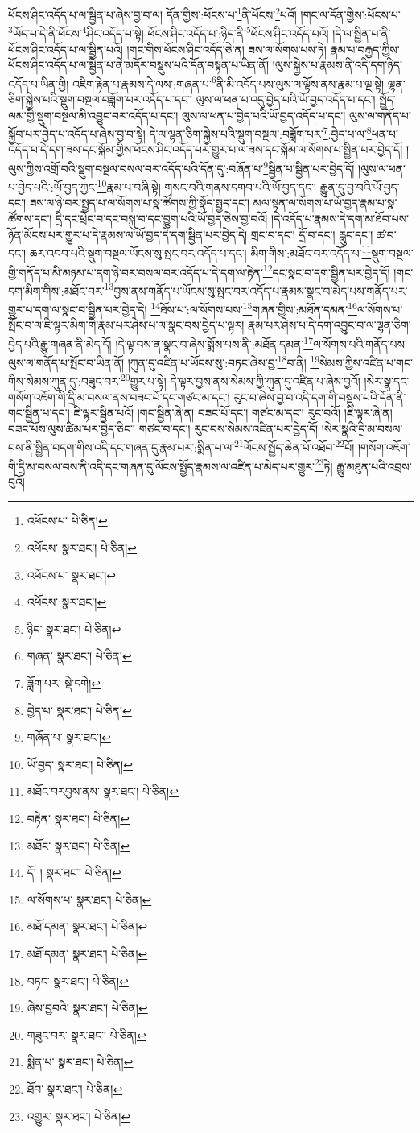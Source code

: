 ཕོངས་ཤིང་འདོད་པ་ལ་སྦྱིན་པ་ཞེས་བྱ་བ་ལ། དོན་གྱིས་:ཕོངས་པ་\footnote{འཕོངས་པ་  པེ་ཅིན། }ནི་ཕོངས་\footnote{འཕོངས་  སྣར་ཐང་།  པེ་ཅིན། }པའོ། །གང་ལ་དོན་གྱིས་:ཕོངས་པ་\footnote{འཕོངས་པ་  སྣར་ཐང་། }ཡོད་པ་དེ་ནི་ཕོངས་\footnote{འཕོངས་  སྣར་ཐང་། }ཤིང་འདོད་པ་སྟེ། ཕོངས་ཤིང་འདོད་པ་:ཉིད་ནི་\footnote{ཉིད་  སྣར་ཐང་།  པེ་ཅིན། }ཕོངས་ཤིང་འདོད་པའོ། །དེ་ལ་སྦྱིན་པ་ནི་ཕོངས་ཤིང་འདོད་པ་ལ་སྦྱིན་པའོ། །གང་གིས་ཕོངས་ཤིང་འདོད་ཅེ་ན། ཟས་ལ་སོགས་པས་ཏེ། རྣམ་པ་བརྒྱད་ཀྱིས་ཕོངས་ཤིང་འདོད་པ་ལ་སྦྱིན་པ་ནི་མདོར་བསྡུས་པའི་དོན་བསྟན་པ་ཡིན་ནོ། །ལུས་སྐྱེས་པ་རྣམས་ནི་འདི་དག་ཉིད་འདོད་པ་ཡིན་གྱི། འཇིག་རྟེན་པ་རྣམས་དེ་ལས་:གཞན་པ་\footnote{གཞན་  སྣར་ཐང་།  པེ་ཅིན། }ནི་མི་འདོད་པས་ལུས་ལ་ལྟོས་ནས་རྣམ་པ་ལྔ་སྟེ། ལྷན་ཅིག་སྐྱེས་པའི་སྡུག་བསྔལ་བཟློག་པར་འདོད་པ་དང་། ལུས་ལ་ཕན་པ་འདུ་བྱེད་པའི་ཡོ་བྱད་འདོད་པ་དང་། སྤྱོད་ལམ་གྱི་སྡུག་བསྔལ་མི་འབྱུང་བར་འདོད་པ་དང་། ལུས་ལ་ཕན་པ་བྱེད་པའི་ཡོ་བྱད་འདོད་པ་དང་། ལུས་ལ་གནོད་པ་སྐྱོབ་པར་བྱེད་པ་འདོད་པ་ཞེས་བྱ་བ་སྟེ། དེ་ལ་ལྷན་ཅིག་སྐྱེས་པའི་སྡུག་བསྔལ་:བཟློག་པར་\footnote{ཟློག་པར་  སྡེ་དགེ། }:བྱེད་པ་ལ་\footnote{བྱེད་པ་  སྣར་ཐང་།  པེ་ཅིན། }ཕན་པ་འདོད་པ་དེ་དག་ཟས་དང་སྐོམ་གྱིས་ཕོངས་ཤིང་འདོད་པར་གྱུར་པ་ལ་ཟས་དང་སྐོམ་ལ་སོགས་པ་སྦྱིན་པར་བྱེད་དོ། །ལུས་ཀྱིས་འགྲོ་བའི་སྡུག་བསྔལ་བསལ་བར་འདོད་པའི་དོན་དུ་:བཞོན་པ་\footnote{གཞོན་པ་  སྣར་ཐང་། }སྦྱིན་པ་སྦྱིན་པར་བྱེད་དོ། །ལུས་ལ་ཕན་པ་བྱེད་པའི་:ཡོ་བྱད་ཀྱང་\footnote{ཡོ་བྱད་  སྣར་ཐང་།  པེ་ཅིན། }རྣམ་པ་བཞི་སྟེ། གསང་བའི་གནས་དགབ་པའི་ཡོ་བྱད་དང་། རྒྱུན་དུ་བྱ་བའི་ཡོ་བྱད་དང་། ཟས་ལ་ཉེ་བར་སྤྱད་པ་ལ་སོགས་པ་སྣ་ཚོགས་ཀྱི་སྣོད་སྤྱད་དང་། མལ་སྟན་ལ་སོགས་པ་ཡོ་བྱད་རྣམ་པ་སྣ་ཚོགས་དང་། དྲི་དང་ཕྲེང་བ་དང་བསྐུ་བ་དང་བྱུག་པའི་ཡོ་བྱད་ཅེས་བྱ་བའོ། །དེ་འདོད་པ་རྣམས་དེ་དག་མ་ཐོབ་པས་ཉོན་མོངས་པར་གྱུར་པ་དེ་རྣམས་ལ་ཡོ་བྱད་དེ་དག་སྦྱིན་པར་བྱེད་དེ། གྲང་བ་དང་། དྲོ་བ་དང་། རླུང་དང་། ཚ་བ་དང་། ཆར་འབབ་པའི་སྡུག་བསྔལ་ཡོངས་སུ་སྤང་བར་འདོད་པ་དང་། མིག་གིས་:མཐོང་བར་འདོད་པ་\footnote{མཐོང་བརབྱས་ནས་  སྣར་ཐང་།  པེ་ཅིན། }སྡུག་བསྔལ་གྱི་གནོད་པ་མི་མཉམ་པ་དག་ཉེ་བར་བསལ་བར་འདོད་པ་དེ་དག་ལ་རྟེན་\footnote{བརྟེན་  སྣར་ཐང་།  པེ་ཅིན། }དང་སྣང་བ་དག་སྦྱིན་པར་བྱེད་དོ། །གང་དག་མིག་གིས་:མཐོང་བར་\footnote{མཐོང་  སྣར་ཐང་།  པེ་ཅིན། }བྱས་ནས་གནོད་པ་ཡོངས་སུ་སྤང་བར་འདོད་པ་རྣམས་སྣང་བ་མེད་པས་གནོད་པར་གྱུར་པ་དག་ལ་སྣང་བ་སྦྱིན་པར་བྱེད་དེ། \footnote{དོ། །   སྣར་ཐང་།  པེ་ཅིན། }ཐོས་པ་:ལ་སོགས་པས་\footnote{ལ་སོགས་པ་  སྣར་ཐང་།  པེ་ཅིན། }གཞན་གྱིས་:མཐོན་དམན་\footnote{མཐོ་དམན་  སྣར་ཐང་།  པེ་ཅིན། }ལ་སོགས་པ་སྤོང་བ་ལ་ཇི་ལྟར་མིག་གི་རྣམ་པར་ཤེས་པ་ལ་སྣང་བས་བྱེད་པ་ལྟར། རྣམ་པར་ཤེས་པ་དེ་དག་འབྱུང་བ་ལ་ལྷན་ཅིག་བྱེད་པའི་རྒྱུ་གཞན་ནི་མེད་དོ། །དེ་ལྟ་བས་ན་སྣང་བ་ཞེས་སྨོས་པས་ནི་:མཐོན་དམན་\footnote{མཐོ་དམན་  སྣར་ཐང་།  པེ་ཅིན། }ལ་སོགས་པའི་གནོད་པས་ལུས་ལ་གནོད་པ་སྤོང་བ་ཡིན་ནོ། །ཀུན་དུ་འཛིན་པ་ཡོངས་སུ་:བཏང་ཞེས་བྱ་\footnote{བཏང་  སྣར་ཐང་།  པེ་ཅིན། }བ་ནི། \footnote{ཞེས་བྱབའི་  སྣར་ཐང་།  པེ་ཅིན། }སེམས་ཀྱིས་འཛིན་པ་གང་གིས་སེམས་ཀུན་དུ་:བཟུང་བར་\footnote{གཟུང་བར་  སྣར་ཐང་།  པེ་ཅིན། }གྱུར་པ་སྟེ། དེ་ལྟར་བྱས་ནས་སེམས་ཀྱི་ཀུན་དུ་འཛིན་པ་ཞེས་བྱའོ། །སེར་སྣ་དང་གསོག་འཇོག་གི་དྲི་མ་བསལ་ནས་བཟང་པོ་དང་གཙང་མ་དང་། རུང་བ་ཞེས་བྱ་བ་འདི་དག་གི་བསྡུས་པའི་དོན་ནི་གང་སྦྱིན་པ་དང་། ཇི་ལྟར་སྦྱིན་པའོ། །གང་སྦྱིན་ཞེ་ན། བཟང་པོ་དང་། གཙང་མ་དང་། རུང་བའོ། །ཇི་ལྟར་ཞེ་ན། བཟང་པོས་ལུས་ཚིམ་པར་བྱེད་ཅིང་། གཙང་བ་དང་། རུང་བས་སེམས་འཛིན་པར་བྱེད་དོ། །སེར་སྣའི་དྲི་མ་བསལ་བས་ནི་སྦྱིན་བདག་གིས་འདི་དང་གཞན་དུ་རྣམ་པར་:སྨིན་པ་ལ་\footnote{སྨིན་པ་  སྣར་ཐང་།  པེ་ཅིན། }ལོངས་སྤྱོད་ཆེན་པོ་འཐོབ་\footnote{ཐོབ་  སྣར་ཐང་།  པེ་ཅིན། }བོ། །གསོག་འཇོག་གི་དྲི་མ་བསལ་བས་ནི་འདི་དང་གཞན་དུ་ལོངས་སྤྱོད་རྣམས་ལ་འཛིན་པ་མེད་པར་གྱུར་\footnote{འགྱུར་  སྣར་ཐང་།  པེ་ཅིན། }ཏེ། རྒྱུ་མཐུན་པའི་འབྲས་བུའོ། 